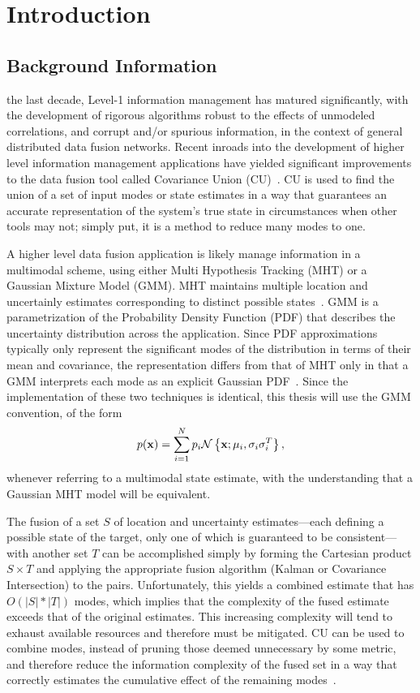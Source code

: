 \chapter{Introduction}\label{chapter:introduction}

\section{Background Information}

 the last decade, Level-1 information management has matured significantly, with the development of
rigorous algorithms robust to the effects of unmodeled correlations, and corrupt and/or spurious information, in the
context of general distributed data fusion networks. Recent inroads into the development of higher level information
management applications have yielded significant improvements to the data fusion tool called Covariance Union
(CU)~\cite{uhlmann03,julier05}. CU is used to find the union of a set of input modes or state estimates in a way that
guarantees an accurate representation of the system's true state in circumstances when other tools may not; simply put,
it is a method to reduce many modes to one.

A higher level data fusion application is likely manage information in a multimodal scheme, using either Multi
Hypothesis Tracking (MHT) or a Gaussian Mixture Model (GMM). MHT maintains multiple location and uncertainly estimates
corresponding to distinct possible states~\cite{barshalom88}. GMM is a parametrization of the Probability Density
Function (PDF) that describes the uncertainty distribution across the application. Since PDF approximations typically
only represent the significant modes of the distribution in terms of their mean and covariance, the representation
differs from that of MHT only in that a GMM interprets each mode as an explicit Gaussian PDF~\cite{fusion06}. Since
the implementation of these two techniques is identical, this thesis will use the GMM convention, of the form
  \begin{equation}\label{eqn:gmm}
    p(\mathbf{x})=\sum_{i=1}^Np_i\mathcal{N}\left\{\mathbf{x};\mu{_i},\sigma_i\sigma_i^T\right\},
  \end{equation}
whenever referring to a multimodal state estimate, with the understanding that a Gaussian MHT model will be equivalent.

The fusion of a set $S$ of location and uncertainty estimates---each defining a possible state of the target, only one
of which is guaranteed to be consistent---with another set $T$ can be accomplished simply by forming the Cartesian
product $S\times T$ and applying the appropriate fusion algorithm (Kalman or Covariance Intersection) to the pairs.
Unfortunately, this yields a combined estimate that has $O(|S|*|T|)$ modes, which implies that the complexity of the
fused estimate exceeds that of the original estimates. This increasing complexity will tend to exhaust available
resources and therefore must be mitigated. CU can be used to combine modes, instead of pruning those deemed unnecessary
by some metric, and therefore reduce the information complexity of the fused set in a way that correctly estimates the
cumulative effect of the remaining modes~\cite{fusion06}.

